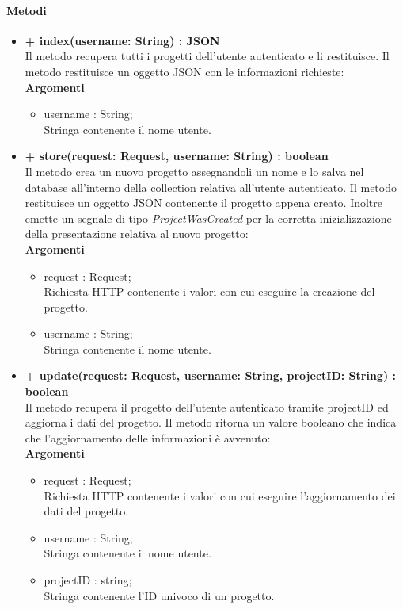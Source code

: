 	\paragraph{Metodi}
		\begin{itemize}
			\item \textbf{+ index(username: String) : JSON}\\
			Il metodo recupera tutti i progetti dell'utente autenticato e li restituisce. Il metodo restituisce un oggetto JSON con le informazioni richieste:\\
			\textbf{Argomenti}
			\begin{itemize}
				\item username : String;\\
				Stringa contenente il nome utente.
			\end{itemize}
			
			\item \textbf{+ store(request: Request, username: String) : boolean}\\
			Il metodo crea un nuovo progetto assegnandoli un nome e lo salva nel database all'interno della collection relativa all'utente autenticato. Il metodo restituisce un oggetto JSON contenente il progetto appena creato. Inoltre emette un segnale di tipo \textit{ProjectWasCreated} per la corretta inizializzazione della presentazione relativa al nuovo progetto:\\
			\textbf{Argomenti}
			\begin{itemize}
				\item request : Request;\\
			 	Richiesta HTTP contenente i valori con cui eseguire la creazione del progetto.
			 	\item username : String;\\
			 	Stringa contenente il nome utente.
			\end{itemize}
			
			\item \textbf{+ update(request: Request, username: String, projectID: String) : boolean}\\
			Il metodo recupera il progetto dell'utente autenticato tramite projectID ed aggiorna i dati del progetto. Il metodo ritorna un valore booleano che indica che l'aggiornamento delle informazioni è avvenuto:\\
			\textbf{Argomenti}
			\begin{itemize}
				\item request : Request;\\
				Richiesta HTTP contenente i valori con cui eseguire l'aggiornamento dei dati del progetto.
				\item username : String;\\
				Stringa contenente il nome utente.
				\item projectID : string; \\
				Stringa contenente l'ID univoco di un progetto.
			\end{itemize}
			

\end{itemize}
